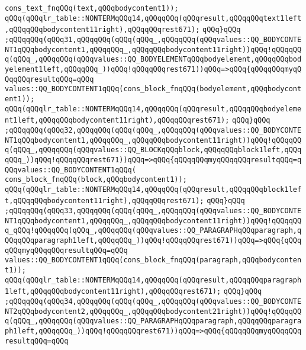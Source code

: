 \verb|cons_text_fnqQQq(text,qQQqbodycontent1));|\newline
\verb|qQQq(qQQqlr_table::NONTERMqQQq14,qQQqqQQq(qQQqresult,qQQqqQQqtext1left,qQQqqQQqbodycontent11right),qQQqqQQqrest671);|\newline
\verb|qQQq}qQQq|\newline
\verb|;qQQqqQQq(qQQq31,qQQqqQQq(qQQq(qQQq_,qQQqqQQq(qQQqvalues::QQ_BODYCONTENT1qQQqbodycontent1,qQQqqQQq_,qQQqqQQqbodycontent11right))qQQq!qQQqqQQq(qQQq_,qQQqqQQq(qQQqvalues::QQ_BODYELEMENTqQQqbodyelement,qQQqqQQqbodyelement1left,qQQqqQQq_))qQQq!qQQqqQQqrest671))qQQq=>qQQq{qQQqqQQqmyqQQqqQQqresultqQQq=qQQq|\newline
\verb|values::QQ_BODYCONTENT1qQQq(cons_block_fnqQQq(bodyelement,qQQqbodycontent1));|\newline
\verb|qQQq(qQQqlr_table::NONTERMqQQq14,qQQqqQQq(qQQqresult,qQQqqQQqbodyelement1left,qQQqqQQqbodycontent11right),qQQqqQQqrest671);|\newline
\verb|qQQq}qQQq|\newline
\verb|;qQQqqQQq(qQQq32,qQQqqQQq(qQQq(qQQq_,qQQqqQQq(qQQqvalues::QQ_BODYCONTENT1qQQqbodycontent1,qQQqqQQq_,qQQqqQQqbodycontent11right))qQQq!qQQqqQQq(qQQq_,qQQqqQQq(qQQqvalues::QQ_BLOCKqQQqblock,qQQqqQQqblock1left,qQQqqQQq_))qQQq!qQQqqQQqrest671))qQQq=>qQQq{qQQqqQQqmyqQQqqQQqresultqQQq=qQQqvalues::QQ_BODYCONTENT1qQQq(|\newline
\verb|cons_block_fnqQQq(block,qQQqbodycontent1));|\newline
\verb|qQQq(qQQqlr_table::NONTERMqQQq14,qQQqqQQq(qQQqresult,qQQqqQQqblock1left,qQQqqQQqbodycontent11right),qQQqqQQqrest671);|\newline
\verb|qQQq}qQQq|\newline
\verb|;qQQqqQQq(qQQq33,qQQqqQQq(qQQq(qQQq_,qQQqqQQq(qQQqvalues::QQ_BODYCONTENT1qQQqbodycontent1,qQQqqQQq_,qQQqqQQqbodycontent11right))qQQq!qQQqqQQq_qQQq!qQQqqQQq(qQQq_,qQQqqQQq(qQQqvalues::QQ_PARAGRAPHqQQqparagraph,qQQqqQQqparagraph1left,qQQqqQQq_))qQQq!qQQqqQQqrest671))qQQq=>qQQq{qQQqqQQqmyqQQqqQQqresultqQQq=qQQq|\newline
\verb|values::QQ_BODYCONTENT1qQQq(cons_block_fnqQQq(paragraph,qQQqbodycontent1));|\newline
\verb|qQQq(qQQqlr_table::NONTERMqQQq14,qQQqqQQq(qQQqresult,qQQqqQQqparagraph1left,qQQqqQQqbodycontent11right),qQQqqQQqrest671);|\newline
\verb|qQQq}qQQq|\newline
\verb|;qQQqqQQq(qQQq34,qQQqqQQq(qQQq(qQQq_,qQQqqQQq(qQQqvalues::QQ_BODYCONTENT2qQQqbodycontent2,qQQqqQQq_,qQQqqQQqbodycontent21right))qQQq!qQQqqQQq(qQQq_,qQQqqQQq(qQQqvalues::QQ_PARAGRAPHqQQqparagraph,qQQqqQQqparagraph1left,qQQqqQQq_))qQQq!qQQqqQQqrest671))qQQq=>qQQq{qQQqqQQqmyqQQqqQQqresultqQQq=qQQq|\newline
